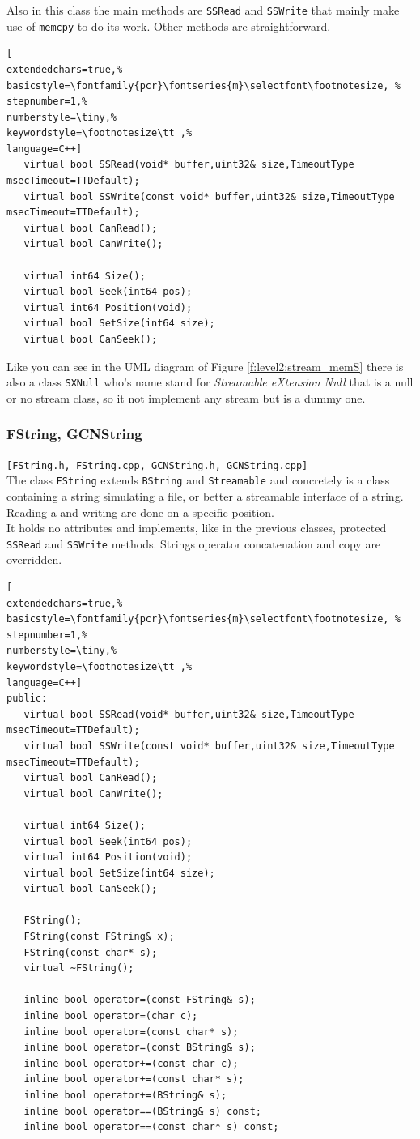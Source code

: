Also in this class the main methods are \texttt{SSRead} and \texttt{SSWrite} that mainly make use of \texttt{memcpy} to do its work. Other methods are straightforward.
\begin{lstlisting}[
extendedchars=true,%
basicstyle=\fontfamily{pcr}\fontseries{m}\selectfont\footnotesize, %
stepnumber=1,%
numberstyle=\tiny,%
keywordstyle=\footnotesize\tt ,%
language=C++]
   virtual bool SSRead(void* buffer,uint32& size,TimeoutType msecTimeout=TTDefault);
   virtual bool SSWrite(const void* buffer,uint32& size,TimeoutType msecTimeout=TTDefault);
   virtual bool CanRead();
   virtual bool CanWrite();

   virtual int64 Size();
   virtual bool Seek(int64 pos);
   virtual int64 Position(void);
   virtual bool SetSize(int64 size);
   virtual bool CanSeek();
\end{lstlisting}

Like you can see in the UML diagram of Figure \ref{f:level2:stream_memS} there is also a class \texttt{SXNull} who's name stand for \textit{Streamable eXtension Null} that is a null or no stream class, so it not implement any stream but is a dummy one.



\subsubsection{FString, GCNString}
\texttt{[FString.h, FString.cpp, GCNString.h, GCNString.cpp]}\\
The class \texttt{FString} extends \texttt{BString} and \texttt{Streamable} and concretely is a class containing a string simulating a file, or better a streamable interface of a string. Reading a and writing are done on a specific position.\\


It holds no attributes and implements, like in the previous classes, protected \texttt{SSRead} and \texttt{SSWrite} methods. Strings operator concatenation and copy are overridden.
\begin{lstlisting}[
extendedchars=true,%
basicstyle=\fontfamily{pcr}\fontseries{m}\selectfont\footnotesize, %
stepnumber=1,%
numberstyle=\tiny,%
keywordstyle=\footnotesize\tt ,%
language=C++]
public:
   virtual bool SSRead(void* buffer,uint32& size,TimeoutType msecTimeout=TTDefault);
   virtual bool SSWrite(const void* buffer,uint32& size,TimeoutType msecTimeout=TTDefault);
   virtual bool CanRead();
   virtual bool CanWrite();

   virtual int64 Size();
   virtual bool Seek(int64 pos);
   virtual int64 Position(void);
   virtual bool SetSize(int64 size);
   virtual bool CanSeek();

   FString();
   FString(const FString& x);
   FString(const char* s);
   virtual ~FString();

   inline bool operator=(const FString& s);
   inline bool operator=(char c);
   inline bool operator=(const char* s);
   inline bool operator=(const BString& s);
   inline bool operator+=(const char c);
   inline bool operator+=(const char* s);
   inline bool operator+=(BString& s);
   inline bool operator==(BString& s) const;
   inline bool operator==(const char* s) const;
\end{lstlisting}

